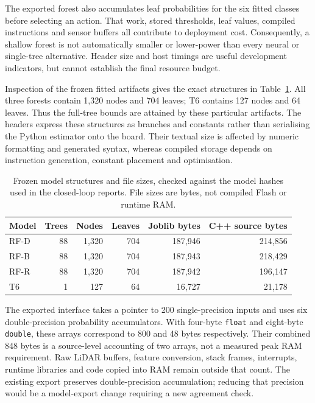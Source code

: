 The exported forest also accumulates leaf probabilities for the six fitted
classes before selecting an action. That work, stored thresholds, leaf values,
compiled instructions and sensor buffers all contribute to deployment cost.
Consequently, a shallow forest is not automatically smaller or lower-power than
every neural or single-tree alternative. Header size and host timings are
useful development indicators, but cannot establish the final resource budget.

Inspection of the frozen fitted artifacts gives the exact structures in
Table~\ref{tab:artifact_resources}. All three forests contain 1,320 nodes and
704 leaves; T6 contains 127 nodes and 64 leaves. Thus the full-tree bounds are
attained by these particular artifacts. The headers express these structures
as branches and constants rather than serialising the Python estimator onto
the board. Their textual size is affected by numeric formatting and generated
syntax, whereas compiled storage depends on instruction generation, constant
placement and optimisation.

\begin{table}[htbp]
\centering\small
\caption[Frozen model structures and file sizes]{Frozen model structures and file sizes, checked against
the model hashes used in the closed-loop reports. File sizes are bytes, not
compiled Flash or runtime RAM.}
\label{tab:artifact_resources}
\begin{tabular}{lrrrrr}
\toprule Model & Trees & Nodes & Leaves & Joblib bytes & C++ source bytes \\
\midrule
RF-D & 88 & 1,320 & 704 & 187,946 & 214,856 \\
RF-B & 88 & 1,320 & 704 & 187,943 & 218,429 \\
RF-R & 88 & 1,320 & 704 & 187,942 & 196,147 \\
T6 & 1 & 127 & 64 & 16,727 & 21,178 \\
\bottomrule
\end{tabular}
\end{table}

The exported interface takes a pointer to 200 single-precision inputs and
uses six double-precision probability accumulators. With four-byte
\texttt{float} and eight-byte \texttt{double}, these arrays correspond to
800 and 48 bytes respectively. Their combined 848 bytes is a source-level
accounting of two arrays, not a measured peak RAM requirement. Raw LiDAR
buffers, feature conversion, stack frames, interrupts, runtime libraries and
code copied into RAM remain outside that count. The existing export preserves
double-precision accumulation; reducing that precision would be a model-export
change requiring a new agreement check.

